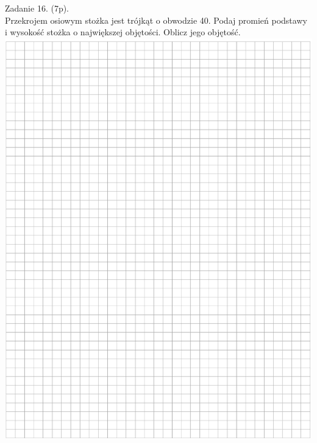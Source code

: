 \documentclass[10pt]{article}
\begin{document}
Zadanie 16. (7p).\\
Przekrojem osiowym stożka jest trójkąt o obwodzie 40. Podaj promień podstawy i wysokość stożka o największej objętości. Oblicz jego objętość.\\
\includegraphics[max width=\textwidth, center]{2024_11_21_498389c978c770348ebcg-14}
\end{document}

